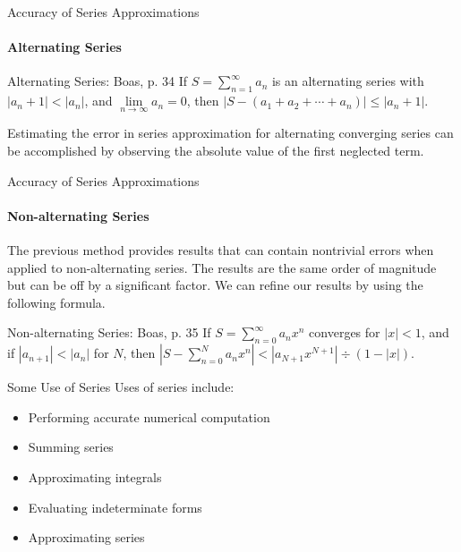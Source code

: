 \documentclass{beamer}
\begin{document}
\begin{frame}{Accuracy of Series Approximations}
	\framesubtitle{Alternating Series}
	\begin{block}{Alternating Series: Boas, p. 34}
	If $S=\sum\limits_{n=1}^\infty a_n$ is an alternating series with $|a_n+1|<|a_n|$, and $\lim\limits_{n\to\infty}a_n=0$, then $|S-(a_1+a_2+\cdots +a_n)|\leq |a_n+1|$.
	\end{block}
	Estimating the error in series approximation for alternating converging series can be accomplished by observing the absolute value of the first neglected term.
\end{frame}
  
\begin{frame}{Accuracy of Series Approximations}
	\framesubtitle{Non-alternating Series}
	The previous method provides results that can contain nontrivial errors when applied to non-alternating series.  The results are the same order of magnitude but can be off by a significant factor.  We can refine our results by using the following formula.
	\begin{block}{Non-alternating Series: Boas, p. 35}
	If $S=\sum\limits_{n=0}^\infty a_n x^n$ converges for $|x|<1$, and if $|a_{n+1}|<|a_n|$ for $N$, then $\left\lvert S-\sum\limits_{n=0}^N a_n x^n \right\rvert<|a_{N+1}x^{N+1}|\div(1-|x|)$.
	\end{block}
\end{frame}
  
\begin{frame}{Some Use of Series}
	Uses of series include:
	\begin{itemize}
		\item Performing accurate numerical computation
		\item Summing series
		\item Approximating integrals
		\item Evaluating indeterminate forms
		\item Approximating series
	\end{itemize}
\end{frame}
  
\end{document}
